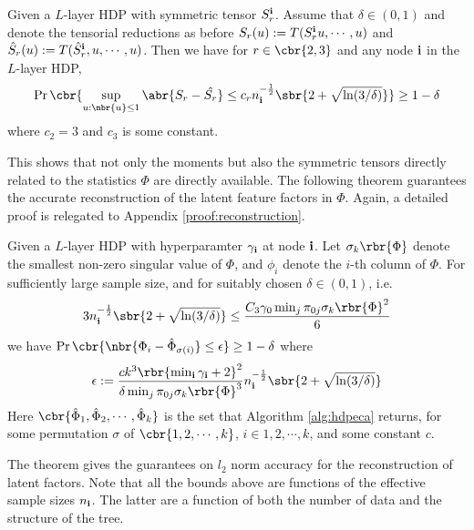 \documentclass[twoside,11pt]{article}
\newcommand{\ib}{{\bf i}}
\begin{document}
{%

\begin{theorem}
\label{theorem:tensorbounds}
Given a $L$-layer HDP with symmetric tensor $S_r^{\ib}$. Assume that
$\delta \in (0, 1)$ and denote the tensorial reductions as before
$S_r(u) := T(S_r^{\ib} u, \cdots, u)$ and $\hat{S}_r(u) :=
T(\hat{S}_r^{\ib}, u, \cdots, u)$. Then we have for $r \in \cbr{2, 3}$ and any node $\ib$ in the $L$-layer HDP, 
\begin{align}
  \label{eq:bounddeviation2}
  \Pr\cbr{\sup_{u: \nbr{u} \leq 1} \abr{ S_r -\hat{S_r}} \leq c_r n_{\ib}^{-\frac{1}{2}} \sbr{2+\sqrt{\ln
      (3/\delta)}}} \geq 1-\delta
\end{align}
where $c_2 = 3$ and $c_3$ is some constant.

\end{theorem}
%
This shows that not only the moments but also the symmetric tensors
directly related to the statistics $\Phi$ are directly available. 
The following theorem guarantees the accurate reconstruction of the
latent feature factors in $\Phi$. Again, a detailed proof is relegated
to Appendix \ref{proof:reconstruction}.

\begin{theorem}
\label{theorem:reconstruction}
%
Given a $L$-layer HDP with hyperparamter $\gamma_{\ib}$ at node
$\ib$. Let $\sigma_k \rbr{\Phi}$ denote the smallest non-zero singular
value of $\Phi$, and $\phi_i$ denote the $i$-th column of $\Phi$. 
For sufficiently large sample size, and for suitably chosen $\delta
\in (0,1)$, i.e.
$$3 n_{\ib}^{-\frac{1}{2}}
\sbr{2+\sqrt{\ln (3/\delta)}}\leq\frac{ C_3  \gamma_0 \min_{j}
  \pi_{0j} \sigma_k \rbr{\Phi}^2}{6}$$ 
we have
$\displaystyle \Pr\cbr{\nbr{\Phi_i -\hat{\Phi}_{\sigma\left(i\right)}}
  \leq   \epsilon} \geq 1-\delta$ where
\begin{align*}
\epsilon :=\frac{ck^3  \rbr{\min_{\ib} \gamma_{\ib}+2}^2}{ \delta
  \min_j \pi_{0j} \sigma_k \rbr{\Phi}^3 } n_\ib^{-\frac{1}{2}} \sbr{2+\sqrt{\ln(3/\delta)}}
\end{align*}
Here $\cbr{ \hat{\Phi}_1, \hat{\Phi}_2, \cdots, \hat{\Phi}_k}$ is the
set that Algorithm \ref{alg:hdpeca} returns, for some permutation $\sigma$
of $\cbr{1,2,\cdots, k}$, $i \in {1,2, \cdots, k}$, and some constant
$c$.
\end{theorem}
The theorem gives the guarantees on $l_2$ norm accuracy for the
reconstruction of latent factors. Note that all the bounds above are
functions of the effective sample sizes $n_\ib$. The latter are a
function of both the number of data and the structure of the
tree. 


}
\end{document}
